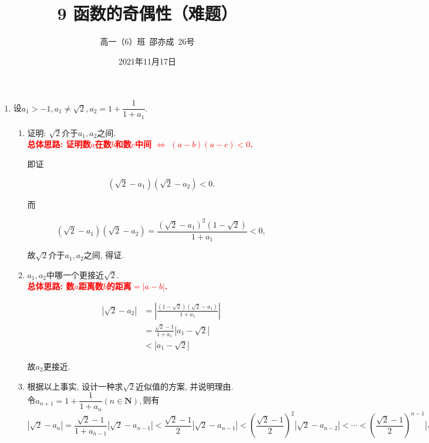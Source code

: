 \documentclass[8pt]{article}
\author{高一（6）班\ 邵亦成\ 26号}
\title{9 函数的奇偶性（难题）}
\date{2021年11月17日}
\begin{document}
	\maketitle

	\begin{enumerate}[label=(\arabic*)]
		\item 设$a_1 > -1, a_1 \neq \sqrt{2}, a_2 = 1+\dfrac{1}{1+a_1}.$
			\begin{enumerate}[label=(\arabic*)]
				\item 证明: $\sqrt 2$介于$a_1, a_2$之间.
					~\\

					\textbf{\textcolor{red}{总体思路: 证明数$a$在数$b$和数$c$中间 $\Leftrightarrow$ $(a-b)(a-c)<0$.}}

					即证

					$$\left(\sqrt{2}-a_1\right)\left(\sqrt{2}-a_2\right)<0.$$

					而

					$$\left(\sqrt{2}-a_1\right)\left(\sqrt{2}-a_2\right)=\frac{\left(\sqrt{2}-a_1\right)^2 \left(1-\sqrt{2}\right)}{1+a_1}<0,$$

					故$\sqrt 2$介于$a_1, a_2$之间, 得证.
				~\\

				\item $a_1, a_2$中哪一个更接近$\sqrt{2}$.
					~\\

					\textbf{\textcolor{red}{总体思路: 数$a$距离数$b$的距离$=|a-b|$.}}

					\begin{align*}
						\left|\sqrt{2}-a_2\right| &= \left|\frac{\left(1-\sqrt{2}\right)\left(\sqrt{2}-a_1\right)}{1+a_1}\right|\\
						&=\frac{\sqrt{2}-1}{1+a_1}\left|a_1-\sqrt{2}\right|\\
						&<\left|a_1-\sqrt{2}\right|
					\end{align*}

					故$a_2$更接近.
				~\\

				\item 根据以上事实, 设计一种求$\sqrt{2}$近似值的方案, 并说明理由.
					~\\

					令$a_{n+1}=1+\dfrac{1}{1+a_n} (n\in\mathbf{N}),$则有$|\sqrt{2}-a_n|=\dfrac{\sqrt{2}-1}{1+a_{n-1}}|\sqrt{2}-a_{n-1}|<\dfrac{\sqrt{2}-1}{2}|\sqrt{2}-a_{n-1}|<\left(\dfrac{\sqrt{2}-1}{2}\right)^2|\sqrt{2}-a_{n-2}|<\cdots<\left(\dfrac{\sqrt{2}-1}{2}\right)^{n-1}|\sqrt{2}-a_1|.$


\end{enumerate}
\end{enumerate}
\end{document}
